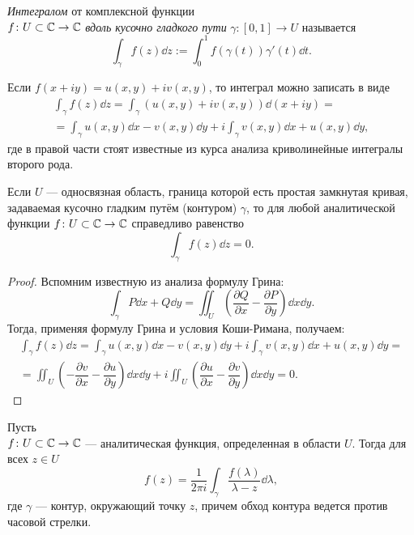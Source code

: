 \begin{definition}
    \emph{Интегралом} от комплексной функции \\$f \colon U \subset \mathbb{C} \to \mathbb{C}$ \emph{вдоль
        кусочно гладкого пути} $\gamma \colon [0, 1] \to U$ называется 
    \[ \int_\gamma f(z) \dd z := \int_0^1 f(\gamma(t)) \gamma'(t) \dd t. \]
\end{definition}

Если $f(x + i y) = u(x, y) + i v(x, y)$, то интеграл можно записать в виде
\begin{multline*}
 \int_\gamma f(z) \dd z = \int_\gamma (u(x, y) + i v(x, y)) \dd (x + i y) =\\ = 
   \int_\gamma u(x, y) \dd x - v(x, y) \dd y + i \int_\gamma v(x, y) \dd x + u(x, y) \dd y, 
\end{multline*}
где в правой части стоят известные из курса анализа криволинейные интегралы второго рода.

\begin{theorem}[Коши]
    Если $U$ --- односвязная область, граница которой есть простая замкнутая кривая, задаваемая
    кусочно гладким путём (контуром) $\gamma$,
    то для любой аналитической функции $f \colon U \subset \mathbb{C} \to \mathbb{C}$
    справедливо равенство
    \[ \int_\gamma f(z) \dd z = 0. \]
\end{theorem}

\begin{proof}
    Вспомним известную из анализа формулу Грина:
    \[ \int_\gamma P \dd x + Q \dd y = \iint_U \left(\dfrac{\partial Q}{\partial x} - \dfrac{\partial P}{\partial y}\right) \dd x \dd y. \]
    Тогда, применяя формулу Грина и условия Коши-Римана, получаем:
    \begin{multline*}
     \int_\gamma f(z) \dd z =  
       \int_\gamma u(x, y) \dd x - v(x, y) \dd y + i \int_\gamma v(x, y) \dd x + u(x, y) \dd y = \\ = \iint_U \left(-\dfrac{\partial v}{\partial x} - \dfrac{\partial u}{\partial y}\right) \dd x \dd y + i \iint_U \left(\dfrac{\partial u}{\partial x} - \dfrac{\partial v}{\partial y}\right) \dd x \dd y = 0.
    \end{multline*}
\end{proof}

\begin{theorem}
    Пусть \\$f \colon U \subset \mathbb{C} \to \mathbb{C}$ --- аналитическая функция, определенная
    в области $U$. Тогда для всех $z \in U$
    \[ f(z) = \frac{1}{2 \pi i} \int_\gamma \frac{f(\lambda)}{\lambda - z} \dd \lambda, \]
    где $\gamma$ --- контур, окружающий точку $z$, причем обход контура ведется против часовой
    стрелки.
\end{theorem}
